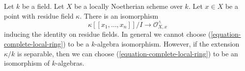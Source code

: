 \begin{lemma}
\label{lemma-complete-local-ring-structure-as-algebra}
Let $k$ be a field. Let $X$ be a locally Noetherian scheme over $k$.
Let $x \in X$ be a point with residue field $\kappa$.
There is an isomorphism
\begin{equation}
\label{equation-complete-local-ring}
\kappa[[x_1, \ldots, x_n]]/I \longrightarrow \mathcal{O}_{X, x}^\wedge
\end{equation}
inducing the identity on residue fields.
In general we cannot choose (\ref{equation-complete-local-ring})
to be a $k$-algebra isomorphism. However, if the extension $\kappa/k$
is separable, then we can choose
(\ref{equation-complete-local-ring}) to be an isomorphism of $k$-algebras.
\end{lemma}
